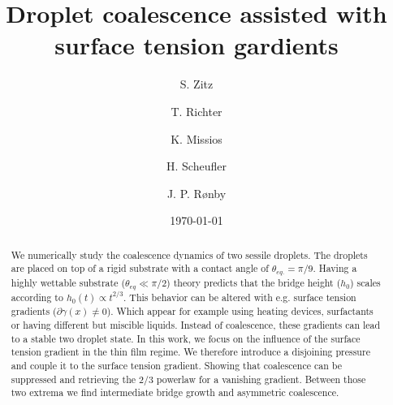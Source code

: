 \documentclass[twocolumn,amsmath,amssymb,showpacs,pre,nofootinbib,superscriptaddress]{revtex4-1} %
\begin{document}

\title{Droplet coalescence assisted with surface tension gardients}

\author{S. Zitz}
 \author{T. Richter}%
 \author{K. Missios}%
 \author{H. Scheufler}%
 \author{J. P. Rønby}%
\date{\today}

\begin{abstract}
We numerically study the coalescence dynamics of two sessile droplets.
The droplets are placed on top of a rigid substrate with a contact angle of $\theta_{eq.} = \pi/9$. 
Having a highly wettable substrate ($\theta_{eq} \ll \pi/2$) theory predicts that the bridge height ($h_0$) scales according to $h_0(t) \propto t^{2/3}.$
This behavior can be altered with e.g. surface tension gradients ($\partial\gamma(x) \neq 0$). 
Which appear for example using heating devices, surfactants or having different but miscible liquids.
Instead of coalescence, these gradients can lead to a stable two droplet state. 
In this work, we focus on the influence of the surface tension gradient in the thin film regime. 
We therefore introduce a disjoining pressure and couple it to the surface tension gradient.
Showing that coalescence can be suppressed and retrieving the $2/3$ powerlaw for a vanishing gradient.
Between those two extrema we find intermediate bridge growth and asymmetric coalescence.
\end{abstract}
\end{document}
